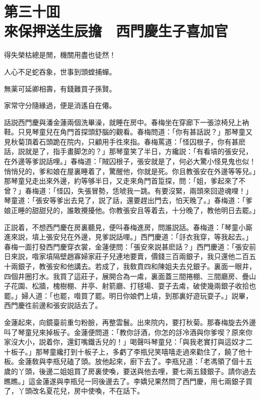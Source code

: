 
\chapter*{第三十囬　\\來保押送生辰擔　西門慶生子喜加官}


\begin{myquote}
得失榮枯總是閒，機關用盡也徒然！

人心不足蛇吞象，世事到頭螳捕蟬。

無薬可延卿相壽，有錢難買子孫賢。

家常守分隨緣過，便是消遙自在僊。
\end{myquote}

話説西門慶與潘金蓮兩個洗畢澡，就睡在房中。春梅坐在穿廊下一張涼椅兒上衲鞋。只見琴童兒在角門首探頭舒腦的觀看。春梅問道：「你有甚話説？」那琴童又見秋菊頂着石頭跪在院内，只顧用手徃來指。春梅罵道：「怪囚根子，你有甚麽話，説就是了，指手畫脚怎的？」那琴童笑了半日，方纔説：「有看墳的張安兒，在外邊等爹説話哩。」春梅道：「賊囚根子，張安就是了，何必大驚小怪見鬼也似！悄悄兒的，爹和娘在屋裏睡着了，驚醒他，你就是死。你且教張安在外邊等等兒。」那琴童兒走出來外邊，約等够半日，又走來角門首踅探，問：「姐，爹起來了不曾？」春梅道：「怪囚，失張冒勢，恁唬我一跳。有要沒緊，兩頭來回遊魂哩！」琴童道：「張安等爹出去見了，説了話，還要趕出門去，怕天晚了。」春梅道：「爹娘正睡的甜甜兒的，誰敢攪擾他。你教張安且等着去，十分晚了，教他明日去罷。」

正説着，不想西門慶在房裏聽見，便呌春梅進房，問誰説話。春梅道：「琴童小廝進來説，墳上張安兒在外邊，見爹説話哩。」西門慶道：「㧱衣我穿，等我起去。」春梅一面打發西門慶穿衣裳，金蓮便問：「張安來説甚麽話？」西門慶道：「張安前日來説，喒家墳隔壁趙寡婦家莊子兒連地要賣，價錢三百兩銀子，我只還他二百五十兩銀子，教張安和他講去。若成了，我敎賁四和陳姐夫去兑銀子。裏面一眼井，四個井圈打水。我買了這莊子，展開合為一䖏，裏面蓋三間捲棚、三間廳房、疊山子花園、松牆，槐樹棚、井亭、射箭廳、打毬場、耍子去䖏，破使幾兩銀子收拾也罷。」婦人道：「也罷，喒買了罷。明日你娘們上墳，到那裏好遊玩耍子。」説畢，西門慶徃前邊和張安説話去了。

金蓮起來，向鏡臺前重匀粉臉，再整雲鬟。出來院内，要打秋菊。那春梅旋去外邊呌了琴童兒來掉板子。金蓮便問道：「教你㧱酒，你怎的㧱冷酒與你爹喫？原來你家沒大小，説着你，還釘嘴鐵舌兒的！」喝聲呌琴童兒：「與我老實打與這奴才二十板子。」那琴童纔打到十板子上，多虧了李瓶兒笑嘻嘻走過來勸住了，饒了他十板。金蓮敎與李瓶兒磕了頭。放他起來，廚下去了。李瓶兒道：「老馮領了個十五歲的丫頭，後邊二姐姐買了房裏使喚，要送與他去哩，要七兩五錢銀子。請你過去瞧瞧。」這金蓮遂與李瓶兒一同後邊去了。李嬌兒果然問了西門慶，用七兩銀子買了，丫頭改名夏花兒，房中使喚，不在話下。

